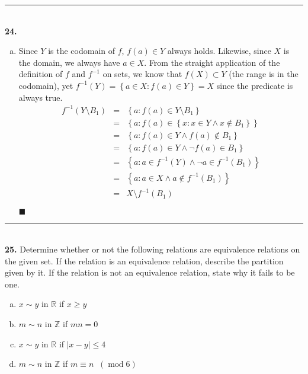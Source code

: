 \documentclass{article}[10pt]
\newenvironment{exercise}[1]
    {\noindent\rule{2cm}{0.4pt} \\
     \textbf{#1.}}
    {}
\newcommand{\qed}{

\hfill\ensuremath{\blacksquare}

}
\begin{document}
\begin{exercise}{24}
\begin{enumerate}[(a)]
    \item
      Since $Y$ is the codomain of $f$, $f(a) \in Y$ always holds.
      Likewise, since $X$ is the domain, we always have $a \in X$.
      From the straight application
      of the definition of $f$ and $f^{-1}$ on sets,
      we know that $f(X) \subset Y$ (the range is in the codomain),
      yet $f^{-1}(Y) = \left\{ a \in X : f(a) \in Y \right\} = X$
      since the predicate is always true.
      \[\begin{array}{rcl}
        f^{-1}(Y \setminus B_1)
        &=& \left\{ a : f(a) \in Y \setminus B_1 \right\} \\
        &=& \left\{ a : f(a) \in \left\{ x : x \in Y \land x \notin B_1
                                 \right\}
            \right\} \\
        &=& \left\{ a : f(a) \in Y \land
                        f(a) \notin B_1 \right\} \\
        &=& \left\{ a : f(a) \in Y \land
                        \lnot f(a) \in B_1 \right\} \\
        &=& \left\{ a : a \in f^{-1}(Y) \land
                        \lnot a \in f^{-1}(B_1) \right\} \\
        &=& \left\{ a : a \in X \land
                        a \notin f^{-1}(B_1) \right\} \\
        &=& X \setminus f^{-1}(B_1)
      \end{array}\]
      \qed
  \end{enumerate}
\end{exercise}


\begin{exercise}{25}
  Determine whether or not
  the following relations are equivalence relations
  on the given set.
  If the relation is an equivalence relation,
  describe the partition given by it.
  If the relation is not an equivalence relation,
  state why it fails to be one.
  \begin{enumerate}[(a)]
    \item $x \sim y$ in $\mathds{R}$ if $x \ge y$
    \item $m \sim n$ in $\mathds{Z}$ if $m n = 0$
    \item $x \sim y$ in $\mathds{R}$ if $|x - y| \le 4$
    \item $m \sim n$ in $\mathds{Z}$
          if $m \equiv n \;\; (\operatorname{mod} 6)$
  \end{enumerate}
\end{exercise}
\end{document}
